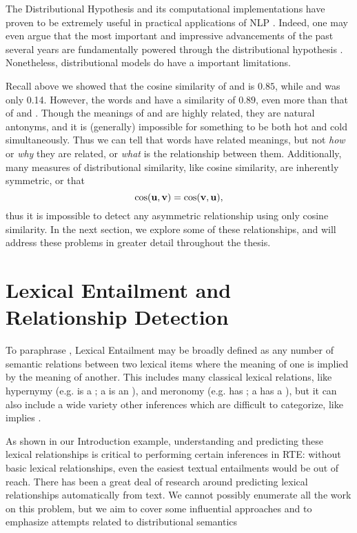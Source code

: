 The Distributional Hypothesis and its computational implementations have proven
to be extremely useful in practical applications of NLP \cite{needcite}. Indeed,
one may even argue that the most important and impressive advancements of
the past several years are fundamentally powered through the distributional
hypothesis \cite{manning:2015:cl}. Nonetheless, distributional models do have
a important limitations.

Recall above we showed that the cosine similarity of  and
 is $0.85$, while  and  was only 0.14.
However,  the words  and  have a similarity of $0.89$, even
more than that of  and . Though the meanings of
 and  are highly related, they are natural antonyms, and it
is (generally) impossible for something to be both hot and cold simultaneously.
Thus we can tell that words have related meanings, but not {\em how} or {\em
why} they are related, or {\em what} is the relationship between them.
Additionally, many measures of distributional similarity, like cosine similarity,
are inherently symmetric, or that
\begin{equation*}
  \text{cos}({\mathbf{u}}, {\mathbf{v}}) = \text{cos}({\mathbf{v}}, {\mathbf{u}}),
\end{equation*}
thus it is impossible to detect any asymmetric relationship using only cosine
similarity. In the next section, we explore some of these relationships, and
will address these problems in greater detail throughout the thesis.

\section{Lexical Entailment and Relationship Detection}

To paraphrase , Lexical Entailment may be broadly
defined as any number of semantic relations between two lexical items where the
meaning of one is implied by the meaning of another.
This includes many classical lexical relations, like hypernymy
(e.g.  is a ; a  is an ), and meronomy
(e.g.  has ; a  has a ), but it can also include a
wide variety other inferences which are difficult to categorize,
like  implies .

As shown in our Introduction example, understanding and predicting these
lexical relationships is critical to performing certain inferences in RTE:
without basic lexical relationships, even the easiest textual entailments would
be out of reach. There has been a great deal of research around predicting
lexical relationships automatically from text. We cannot possibly enumerate all
the work on this problem, but we aim to cover some influential approaches and
to emphasize attempts related to distributional semantics

